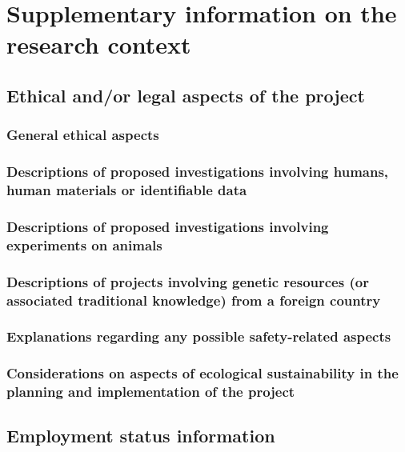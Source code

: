 \documentclass{scrartcl}
\begin{document}
\clearpage
\renewcommand{\maxpage}{8}
\setcounter{page}{1}

\section{Supplementary information on the research context}

\subsection{Ethical and/or legal aspects of the project}

\subsubsection{General ethical aspects}

\subsubsection{Descriptions of proposed investigations involving humans, human materials or identifiable data}

\subsubsection{Descriptions of proposed investigations involving experiments on animals}

\subsubsection{Descriptions of projects involving genetic resources (or associated traditional knowledge) from a foreign country}

\subsubsection{Explanations regarding any possible safety-related aspects}



\subsubsection{Considerations on aspects of ecological sustainability in the planning and implementation of the project}

\subsection{Employment status information}
\end{document}
